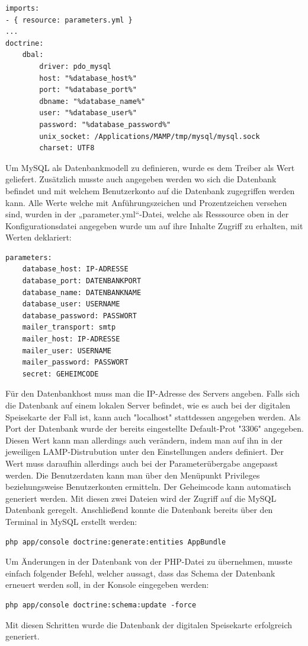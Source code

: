 	\lstset{language=php}
  	\begin{lstlisting}
imports:
- { resource: parameters.yml }
...
doctrine:
	dbal: 
		driver: pdo_mysql
		host: "%database_host%"
		port: "%database_port%"
		dbname: "%database_name%"
		user: "%database_user%"
		password: "%database_password%"
		unix_socket: /Applications/MAMP/tmp/mysql/mysql.sock
		charset: UTF8
  	\end{lstlisting}
Um MySQL als Datenbankmodell zu definieren, wurde es dem Treiber als Wert geliefert. Zusätzlich musste auch angegeben werden wo sich die Datenbank befindet und mit welchem Benutzerkonto auf die Datenbank zugegriffen werden kann.
Alle Werte welche mit Anführungszeichen und Prozentzeichen versehen sind, wurden in der „parameter.yml“-Datei, welche als Resssource oben in der Konfigurationsdatei angegeben wurde um auf ihre Inhalte Zugriff zu erhalten, mit Werten deklariert:
	\lstset{language=php}
  	\begin{lstlisting}
parameters:
    database_host: IP-ADRESSE
    database_port: DATENBANKPORT
    database_name: DATENBANKNAME
    database_user: USERNAME
    database_password: PASSWORT
    mailer_transport: smtp
    mailer_host: IP-ADRESSE
    mailer_user: USERNAME
    mailer_password: PASSWORT
    secret: GEHEIMCODE
  	\end{lstlisting}
Für den Datenbankhost muss man die IP-Adresse des Servers angeben. Falls sich die Datenbank auf einem lokalen Server befindet, wie es auch bei der digitalen Speisekarte der Fall ist, kann auch "localhost" stattdessen angegeben werden. Als Port der Datenbank wurde der bereits eingestellte Default-Prot "3306" angegeben. Diesen Wert kann man allerdings auch verändern, indem man auf ihn in der jeweiligen LAMP-Distrubution unter den Einstellungen anders definiert. Der Wert muss daraufhin allerdings auch bei der Parameterübergabe angepasst werden. Die Benutzerdaten kann man über den Menüpunkt Privileges beziehungsweise Benutzerkonten ermitteln. Der Geheimcode kann automatisch generiert werden.
Mit diesen zwei Dateien wird der Zugriff auf die MySQL Datenbank geregelt.
Anschließend konnte die Datenbank bereits über den Terminal in MySQL erstellt werden:
	\lstset{language = bash}
  	\begin{lstlisting}
php app/console doctrine:generate:entities AppBundle
  	\end{lstlisting}
Um Änderungen in der Datenbank von der PHP-Datei zu übernehmen, musste einfach folgender Befehl, welcher aussagt, dass das Schema der Datenbank erneuert werden soll, in der Konsole eingegeben werden:
	\lstset{language=php}
  	\begin{lstlisting}
php app/console doctrine:schema:update -force
  	\end{lstlisting}
Mit diesen Schritten wurde die Datenbank der digitalen Speisekarte erfolgreich generiert.

